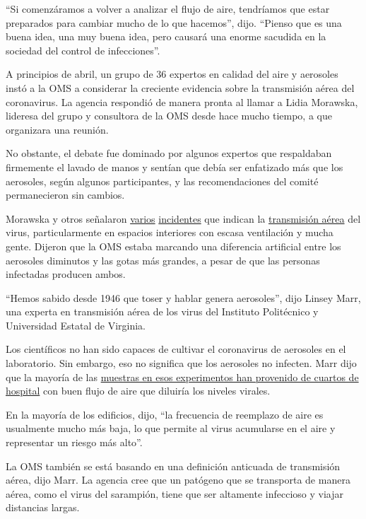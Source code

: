 ``Si comenzáramos a volver a analizar el flujo de aire, tendríamos que
estar preparados para cambiar mucho de lo que hacemos'', dijo. ``Pienso
que es una buena idea, una muy buena idea, pero causará una enorme
sacudida en la sociedad del control de infecciones''.

A principios de abril, un grupo de 36 expertos en calidad del aire y
aerosoles instó a la OMS a considerar la creciente evidencia sobre la
transmisión aérea del coronavirus. La agencia respondió de manera pronta
al llamar a Lidia Morawska, lideresa del grupo y consultora de la OMS
desde hace mucho tiempo, a que organizara una reunión.

No obstante, el debate fue dominado por algunos expertos que respaldaban
firmemente el lavado de manos y sentían que debía ser enfatizado más que
los aerosoles, según algunos participantes, y las recomendaciones del
comité permanecieron sin cambios.

Morawska y otros señalaron
\href{https://www.nytimes.com/2020/05/12/health/coronavirus-choir.html}{varios}
\href{https://www.nytimes.com/2020/04/20/health/airflow-coronavirus-restaurants.html}{incidentes}
que indican la
\href{https://news.sky.com/story/coronavirus-circulating-air-may-have-spread-covid-19-to-1-500-german-meat-plant-staff-12014156}{transmisión
aérea} del virus, particularmente en espacios interiores con escasa
ventilación y mucha gente. Dijeron que la OMS estaba marcando una
diferencia artificial entre los aerosoles diminutos y las gotas más
grandes, a pesar de que las personas infectadas producen ambos.

``Hemos sabido desde 1946 que toser y hablar genera aerosoles'', dijo
Linsey Marr, una experta en transmisión aérea de los virus del Instituto
Politécnico y Universidad Estatal de Virginia.

Los científicos no han sido capaces de cultivar el coronavirus de
aerosoles en el laboratorio. Sin embargo, eso no significa que los
aerosoles no infecten. Marr dijo que la mayoría de las
\href{https://www.sciencedirect.com/science/article/pii/S0013935120307143?via\%3Dihub}{muestras
en esos experimentos han provenido de cuartos de hospital} con buen
flujo de aire que diluiría los niveles virales.

En la mayoría de los edificios, dijo, ``la frecuencia de reemplazo de
aire es usualmente mucho más baja, lo que permite al virus acumularse en
el aire y representar un riesgo más alto''.

La OMS también se está basando en una definición anticuada de
transmisión aérea, dijo Marr. La agencia cree que un patógeno que se
transporta de manera aérea, como el virus del sarampión, tiene que ser
altamente infeccioso y viajar distancias largas.

